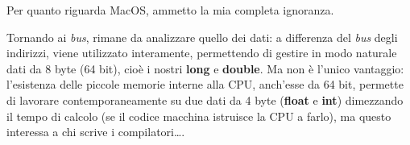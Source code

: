 \begin{subappendices}
Per quanto riguarda MacOS, ammetto la mia completa ignoranza.

Tornando ai \emph{bus}, rimane da analizzare quello dei dati: a  differenza del \emph{bus} degli indirizzi, viene utilizzato interamente, permettendo di gestire in modo naturale dati da 8 byte (64 bit), cioè i nostri \textbf{long} e \textbf{double}. Ma non è l'unico vantaggio: l'esistenza delle piccole memorie interne alla CPU, anch'esse da 64 bit, permette di lavorare contemporaneamente su due dati da 4 byte (\textbf{float} e \textbf{int}) dimezzando il tempo di calcolo (se il codice macchina istruisce la CPU a farlo), ma questo interessa a chi scrive i compilatori\ldots.

\end{subappendices}
